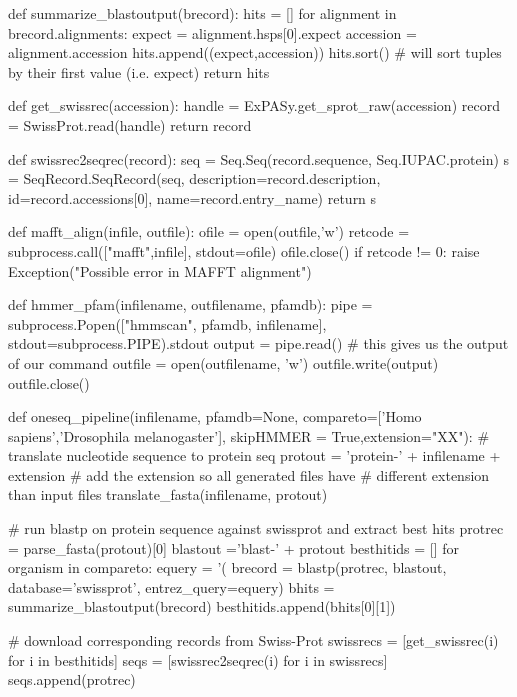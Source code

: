 \documentclass[10pt,letterpaper]{scrartcl}
\begin{document}
\begin{python}
def summarize_blastoutput(brecord):
    hits = []
    for alignment in brecord.alignments:
        expect = alignment.hsps[0].expect
        accession = alignment.accession
        hits.append((expect,accession))
    hits.sort() # will sort tuples by their first value (i.e. expect)
    return hits       

def get_swissrec(accession):
    handle = ExPASy.get_sprot_raw(accession)
    record = SwissProt.read(handle)
    return record
    
def swissrec2seqrec(record):
    seq = Seq.Seq(record.sequence, Seq.IUPAC.protein)
    s = SeqRecord.SeqRecord(seq, description=record.description, 
                id=record.accessions[0], name=record.entry_name)
    return s             

def mafft_align(infile, outfile):
    ofile = open(outfile,'w')
    retcode = subprocess.call(["mafft",infile], stdout=ofile)
    ofile.close()
    if retcode != 0:
        raise Exception("Possible error in MAFFT alignment")    
        
def hmmer_pfam(infilename, outfilename, pfamdb):
    pipe = subprocess.Popen(["hmmscan", pfamdb, infilename], 
            stdout=subprocess.PIPE).stdout
    output = pipe.read() # this gives us the output of our command
    outfile = open(outfilename, 'w')
    outfile.write(output)
    outfile.close()
    
def oneseq_pipeline(infilename, pfamdb=None,
                    compareto=['Homo sapiens','Drosophila melanogaster'],
                    skipHMMER = True,extension="XX"):
    # translate nucleotide sequence to protein seq
    protout = 'protein-' + infilename + extension     
                # add the extension so all generated files have
                # different extension than input files        
    translate_fasta(infilename, protout)
    
    # run blastp on protein sequence against swissprot and extract best hits
    protrec = parse_fasta(protout)[0]        
    blastout ='blast-' + protout        
    besthitids = []
    for organism in compareto:
        equery = '(%
        brecord = blastp(protrec, blastout, database='swissprot', entrez_query=equery)
        bhits = summarize_blastoutput(brecord)
        besthitids.append(bhits[0][1])

    # download corresponding records from Swiss-Prot
    swissrecs = [get_swissrec(i) for i in besthitids]
    seqs = [swissrec2seqrec(i) for i in swissrecs]
    seqs.append(protrec)    
    

\end{python}
\end{document}
